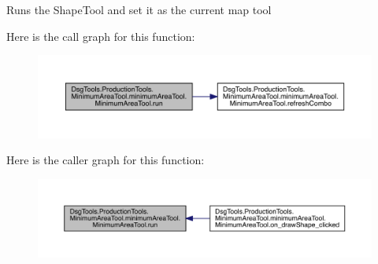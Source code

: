 \begin{DoxyVerb}Runs the ShapeTool and set it as the current map tool
\end{DoxyVerb}
 Here is the call graph for this function\+:
\nopagebreak
\begin{figure}[H]
\begin{center}
\leavevmode
\includegraphics[width=350pt]{class_dsg_tools_1_1_production_tools_1_1_minimum_area_tool_1_1minimum_area_tool_1_1_minimum_area_tool_a84120b6ed248ccb405109998d660698a_cgraph}
\end{center}
\end{figure}
Here is the caller graph for this function\+:
\nopagebreak
\begin{figure}[H]
\begin{center}
\leavevmode
\includegraphics[width=350pt]{class_dsg_tools_1_1_production_tools_1_1_minimum_area_tool_1_1minimum_area_tool_1_1_minimum_area_tool_a84120b6ed248ccb405109998d660698a_icgraph}
\end{center}
\end{figure}
\mbox{\label{class_dsg_tools_1_1_production_tools_1_1_minimum_area_tool_1_1minimum_area_tool_1_1_minimum_area_tool_a9834d0ef71f8764d64fb8a2c524db0b4}} 
